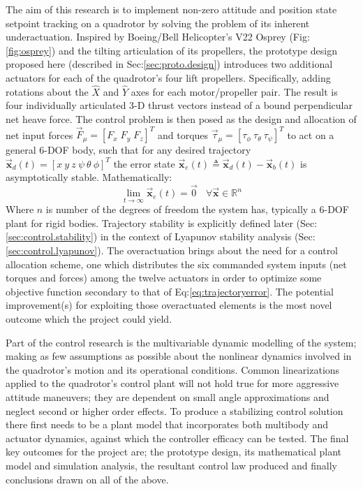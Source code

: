 The aim of this research is to implement non-zero attitude and position state setpoint tracking on a quadrotor by solving the problem of its inherent underactuation. Inspired by Boeing/Bell Helicopter's V22 Osprey (Fig:\ref{fig:osprey}) and the tilting articulation of its propellers, the prototype design proposed here (described in Sec:\ref{sec:proto.design}) introduces two additional actuators for each of the quadrotor's four lift propellers. Specifically, adding rotations about the $\hat{X}$ and $\hat{Y}$ axes for each motor/propeller pair. The result is four individually articulated 3-D thrust vectors instead of a bound perpendicular net heave force. The control problem is then posed as the design and allocation of net input forces $\vec{F}_{\mu} = [F_x\;F_y\;F_z]^T$ and torques $\vec{\tau}_{\mu} = [\tau_{\phi}~\tau_{\theta}~\tau_{\psi}]^T$ to act on a general 6-DOF body, such that for any desired trajectory $\vec{\mathbf{x}}_d(t)=[x~y~z~\psi~\theta~\phi]^T$ the error state $\vec{\mathbf{x}}_e(t) \triangleq \vec{\mathbf{x}}_d(t) - \vec{\mathbf{x}}_b(t)$ is asymptotically stable. Mathematically:
\begin{equation} \label{eq:trajectoryerror}
\lim_{t \rightarrow \infty} \vec{\mathbf{x}}_e(t) = \vec{0}~~~~\forall \vec{\mathbf{x}} \in \mathbb{R}^n
\end{equation}
Where $n$ is number of the degrees of freedom the system has, typically a 6-DOF plant for rigid bodies. Trajectory stability is explicitly defined later (Sec:\ref{sec:control.stability}) in the context of Lyapunov stability analysis (Sec:\ref{sec:control.lyapunov}). The overactuation brings about the need for a control allocation scheme, one which distributes the six commanded system inputs (net torques and forces) among the twelve actuators in order to optimize some objective function secondary to that of Eq:\ref{eq:trajectoryerror}. The potential improvement(s) for exploiting those overactuated elements is the most novel outcome which the project could yield.
\par
Part of the control research is the multivariable dynamic modelling of the system; making as few assumptions as possible about the nonlinear dynamics involved in the quadrotor's motion and its operational conditions. Common linearizations applied to the quadrotor's control plant will not hold true for more aggressive attitude maneuvers; they are dependent on small angle approximations and neglect second or higher order effects. To produce a stabilizing control solution there first needs to be a plant model that incorporates both multibody and actuator dynamics, against which the controller efficacy can be tested. The final key outcomes for the project are; the prototype design, its mathematical plant model and simulation analysis, the resultant control law produced and finally conclusions drawn on all of the above.
